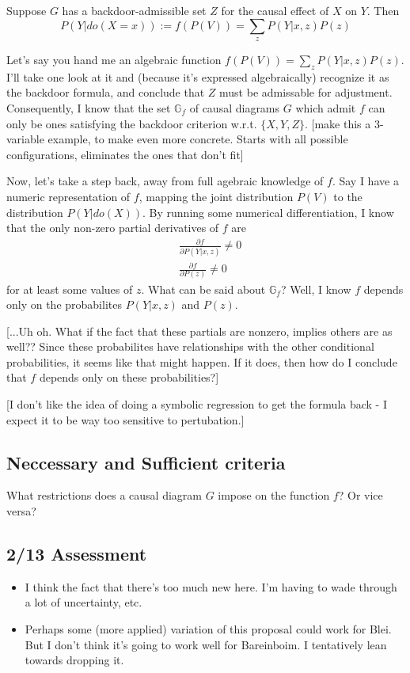 \documentclass[letterpaper,10pt]{article}
\begin{document}
Suppose $G$ has a backdoor-admissible set $Z$ for the causal effect of $X$ on $Y$. Then 
\[
P(Y|do(X=x)) := f(P(V)) = \sum_z P(Y|x,z)P(z)
\]

Let's say you hand me an algebraic function $f(P(V)) = \sum_z P(Y|x,z)P(z)$. I'll take one look at it and (because it's expressed algebraically) recognize it as the backdoor formula, and conclude that $Z$ must be admissable for adjustment. Consequently, I know that the set $\mathbb{G}_f$ of causal diagrams $G$ which admit $f$ can only be ones satisfying the backdoor criterion w.r.t. $\{X,Y,Z\}$. [make this a 3-variable example, to make even more concrete. Starts with all possible configurations, eliminates the ones that don't fit]

Now, let's take a step back, away from full agebraic knowledge of $f$. Say I have a numeric representation of $f$, mapping the joint distribution $P(V)$ to the distribution $P(Y|do(X))$. By running some numerical differentiation, I know that the only non-zero partial derivatives of $f$ are
\begin{align*}
& \frac{\partial f}{\partial P(Y|x,z)} \neq 0\\
& \frac{\partial f}{\partial P(z)} \neq 0 
\end{align*}
for at least some values of $z$. What can be said about $\mathbb{G}_f$? Well, I know $f$ depends only on the probabilites $P(Y|x,z)$ and $P(z)$.

[...Uh oh. What if the fact that these partials are nonzero, implies others are as well?? Since these probabilites have relationships with the other conditional probabilities, it seems like that might happen. If it does, then how do I conclude that $f$ depends only on these probabilities?]

[I don't like the idea of doing a symbolic regression to get the formula back - I expect it to be way too sensitive to pertubation.]

\subsection{Neccessary and Sufficient criteria}
What restrictions does a causal diagram $G$ impose on the function $f$? Or vice versa?


\subsection{2/13 Assessment}
\begin{itemize}
  \item I think the fact that there's too much new here. I'm having to wade through a lot of uncertainty, etc.
  \item Perhaps some (more applied) variation of this proposal could work for Blei. But I don't think it's going to work well for Bareinboim. I tentatively lean towards dropping it.
\end{itemize}
\end{document}
